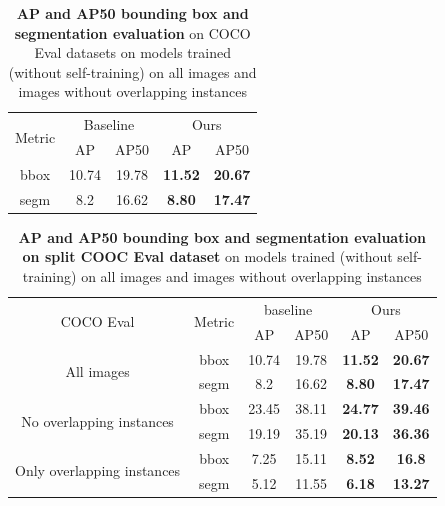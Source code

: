 \begin{table}[htbp]
	\centering
	\begin{tabular}{c|cc|cc}
		\toprule
		\multirow{2}{*}{Metric} & \multicolumn{2}{c|}{Baseline} & \multicolumn{2}{c}{Ours} \\ \cmidrule{2-5}
		& AP & AP50 & AP & AP50 \\ \midrule
		bbox & 10.74 & 19.78 & \textbf{11.52} & \textbf{20.67} \\
		\midrule
		segm & 8.2 & 16.62 & \textbf{8.80} & \textbf{17.47} \\
		\bottomrule
	\end{tabular}
	\caption[\textbf{Evaluation of Models Trained with and without overlapping instances }]{\textbf{AP and AP50 bounding box and segmentation evaluation} on COCO Eval datasets on models trained (without self-training) on all images and images without overlapping instances}
	\label{tab:overlap_analysis}
\end{table}

\begin{table}[htbp]
	\centering
	\begin{tabular}{c|c|cc|cc}
		\toprule
		\multirow{2}{*}{COCO Eval} & \multirow{2}{*}{Metric} & \multicolumn{2}{c|}{baseline} & \multicolumn{2}{c}{Ours} \\ \cmidrule{3-6}
		& & AP & AP50 & AP & AP50 \\ \midrule
		\multirow{2}{*}{All images} & bbox & 10.74 & 19.78 & \textbf{11.52} & \textbf{20.67} \\ 
		& segm & 8.2 & 16.62 & \textbf{8.80} & \textbf{17.47}  \\ \midrule
		\multirow{2}{*}{No overlapping instances} & bbox & 23.45 & 38.11 & \textbf{24.77} & \textbf{39.46} \\
		& segm & 19.19 & 35.19  & \textbf{20.13} & \textbf{36.36} \\
		\midrule
		\multirow{2}{*}{Only overlapping instances} & bbox & 7.25 & 15.11 & \textbf{8.52} & \textbf{16.8} \\ 
		& segm & 5.12 & 11.55 & \textbf{6.18} & \textbf{13.27} \\
		\bottomrule
	\end{tabular}
	\caption[\textbf{Evaluation of Models Trained with and without overlapping instances with evaluation dataset split}]{\textbf{AP and AP50 bounding box and segmentation evaluation on split COOC Eval dataset} on models trained (without self-training) on all images and images without overlapping instances}
	\label{tab:combined_overlap_eval}
\end{table}

